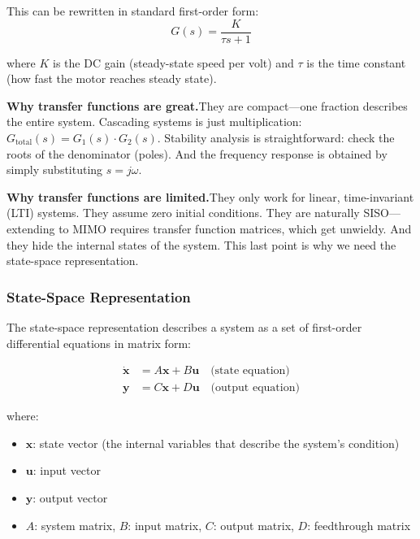 This can be rewritten in standard first-order form:
\begin{equation}
G(s) = \frac{K}{\tau s + 1}
\end{equation}

where $K$ is the DC gain (steady-state speed per volt) and $\tau$ is the time constant (how fast the motor reaches steady state).

\textbf{Why transfer functions are great.}\;They are compact---one fraction describes the entire system. Cascading systems is just multiplication: $G_{\text{total}}(s) = G_1(s) \cdot G_2(s)$. Stability analysis is straightforward: check the roots of the denominator (poles). And the frequency response is obtained by simply substituting $s = j\omega$.

\textbf{Why transfer functions are limited.}\;They only work for linear, time-invariant (LTI) systems. They assume zero initial conditions. They are naturally SISO---extending to MIMO requires transfer function matrices, which get unwieldy. And they hide the internal states of the system. This last point is why we need the state-space representation.

\subsubsection{State-Space Representation}

The state-space representation describes a system as a set of first-order differential equations in matrix form:

\begin{align}
\dot{\mathbf{x}} &= A\mathbf{x} + B\mathbf{u} \quad \text{(state equation)} \\
\mathbf{y} &= C\mathbf{x} + D\mathbf{u} \quad \text{(output equation)}
\end{align}

where:
\begin{itemize}[nosep]
    \item $\mathbf{x}$: state vector (the internal variables that describe the system's condition)
    \item $\mathbf{u}$: input vector
    \item $\mathbf{y}$: output vector
    \item $A$: system matrix, $B$: input matrix, $C$: output matrix, $D$: feedthrough matrix
\end{itemize}


